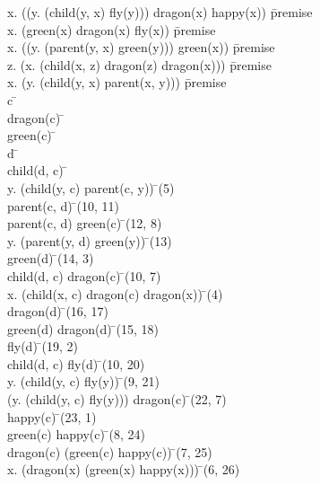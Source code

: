 \documentclass{article}
\begin{document}
\begin{proofbox}
\: \forall x. ((\forall y. (child(y, x) \rightarrow fly(y))) \land dragon(x) \rightarrow happy(x)) \= \hbox{premise} \\
\: \forall x. (green(x) \land dragon(x) \rightarrow fly(x)) \= \hbox{premise} \\
\: \forall x. ((\exists y. (parent(y, x) \land green(y))) \rightarrow green(x)) \= \hbox{premise} \\
\: \forall z. (\forall x. (child(x, z) \land dragon(z) \rightarrow dragon(x))) \= \hbox{premise} \\
\: \forall x. (\forall y. (child(y, x) \rightarrow parent(x, y))) \= \hbox{premise} \\
\open
\: c \= \forallintroconst \\
\open
\: dragon(c) \= \asm \\
\open
\: green(c) \= \asm \\
\open
\: d \= \forallintroconst \\
\open
\: child(d, c) \= \asm \\
\: \forall y. (child(y, c) \rightarrow parent(c, y)) \= \forallelim(5) \\
\: parent(c, d) \= \forallelim(10, 11) \\
\: parent(c, d) \land green(c) \= \andintro(12, 8) \\
\: \exists y. (parent(y, d) \land green(y)) \= \existsintro(13) \\
\: green(d) \= \forallelim(14, 3) \\
\: child(d, c) \land dragon(c) \= \andintro(10, 7) \\
\: \forall x. (child(x, c) \land dragon(c) \rightarrow dragon(x)) \= \forallelim(4) \\
\: dragon(d) \= \forallelim(16, 17) \\
\: green(d) \land dragon(d) \= \andintro(15, 18) \\
\: fly(d) \= \forallelim(19, 2) \\
\close
\: child(d, c) \rightarrow fly(d) \= \impliesintro(10, 20) \\
\close
\: \forall y. (child(y, c) \rightarrow fly(y)) \= \forallintro(9, 21) \\
\: (\forall y. (child(y, c) \rightarrow fly(y))) \land dragon(c) \= \andintro(22, 7) \\
\: happy(c) \= \forallelim(23, 1) \\
\close
\: green(c) \rightarrow happy(c) \= \impliesintro(8, 24) \\
\close
\: dragon(c) \rightarrow (green(c) \rightarrow happy(c)) \= \impliesintro(7, 25) \\
\close
\: \forall x. (dragon(x) \rightarrow (green(x) \rightarrow happy(x))) \= \forallintro(6, 26) \\
\end{proofbox}
\end{document}
